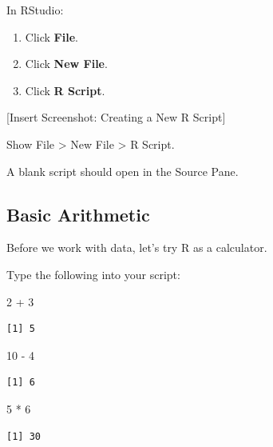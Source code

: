 \documentclass[
  letterpaper,
  DIV=11,
  numbers=noendperiod]{scrartcl}
\newenvironment{Shaded}{\begin{snugshade}}{\end{snugshade}}
\newcommand{\DecValTok}[1]{\textcolor[rgb]{0.68,0.00,0.00}{#1}}
\newcommand{\SpecialCharTok}[1]{\textcolor[rgb]{0.37,0.37,0.37}{#1}}
\providecommand{\tightlist}{%
  \setlength{\itemsep}{0pt}\setlength{\parskip}{0pt}}
\begin{document}
In RStudio:

\begin{enumerate}
\def\labelenumi{\arabic{enumi}.}
\tightlist
\item
  Click \textbf{File}.
\item
  Click \textbf{New File}.
\item
  Click \textbf{R Script}.
\end{enumerate}

{[}Insert Screenshot: Creating a New R Script{]}

Show File \textgreater{} New File \textgreater{} R Script.

A blank script should open in the Source Pane.

\subsection{Basic Arithmetic}\label{basic-arithmetic}

Before we work with data, let's try R as a calculator.

Type the following into your script:

\begin{Shaded}
\begin{Highlighting}[]
\DecValTok{2} \SpecialCharTok{+} \DecValTok{3}
\end{Highlighting}
\end{Shaded}

\begin{verbatim}
[1] 5
\end{verbatim}

\begin{Shaded}
\begin{Highlighting}[]
\DecValTok{10} \SpecialCharTok{{-}} \DecValTok{4}
\end{Highlighting}
\end{Shaded}

\begin{verbatim}
[1] 6
\end{verbatim}

\begin{Shaded}
\begin{Highlighting}[]
\DecValTok{5} \SpecialCharTok{*} \DecValTok{6}
\end{Highlighting}
\end{Shaded}

\begin{verbatim}
[1] 30
\end{verbatim}
\end{document}
